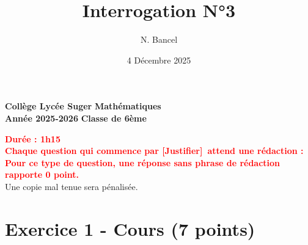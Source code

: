 \documentclass{exam}
\title{Interrogation N°3}
\author{N. Bancel}
\date{4 Décembre 2025}
\begin{document}
\textbf{Collège Lycée Suger}
\hfill
\textbf{Mathématiques} \\

\textbf{Année 2025-2026}
\hfill
\textbf{Classe de 6ème} \\

{\let\newpage\relax\maketitle}

\begin{center}
\textbf{\textcolor{red}{Durée : 1h15}} \\
\textbf{\textcolor{red}{Chaque question qui commence par [Justifier] attend une rédaction : \\
Pour ce type de question, une réponse sans phrase de rédaction rapporte 0 point.}} \\
Une copie mal tenue sera pénalisée.

\end{center}

\section*{Exercice 1 - Cours (7 points)}
\end{document}
